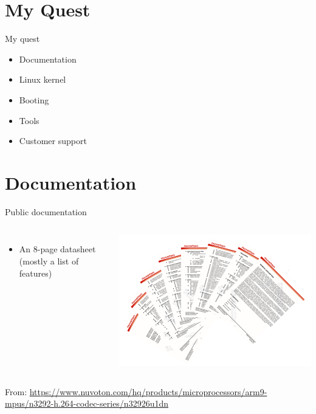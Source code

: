 \documentclass[xetex,table,aspectratio=169]{beamer}
\begin{document}
\section{My Quest}

\begin{frame}{My quest}
  \begin{itemize}
  \item Documentation
  \item Linux kernel
  \item Booting
  \item Tools
  \item Customer support
  \end{itemize}
\end{frame}

\section{Documentation}

\begin{frame}{Public documentation}
  \begin{columns}
    \begin{itemize}
    \item An 8-page datasheet (mostly a list of features)
    \end{itemize}
    \includegraphics[height=0.4\textheight]{images/datasheet.png}
  \end{columns}

  \vspace{0.2\textheight}

  From: {\tiny\url{https://www.nuvoton.com/hq/products/microprocessors/arm9-mpus/n3292-h.264-codec-series/n32926u1dn}}
\end{frame}
\end{document}
